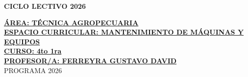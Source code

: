 \documentclass[a4paper,landscape]{article}
\begin{document}

\begin{center}
\fontsize{12pt}{14pt}\selectfont\bfseries CICLO LECTIVO 2026
\end{center}

\vspace{0.5cm}
\noindent\textbf{\underline{ÁREA: TÉCNICA AGROPECUARIA}}\\
\noindent\textbf{\underline{ESPACIO CURRICULAR: MANTENIMIENTO DE MÁQUINAS Y EQUIPOS}}\\
\noindent\textbf{\underline{CURSO: 4to 1ra}}\\
\noindent\textbf{\underline{PROFESOR/A: FERREYRA GUSTAVO DAVID}}\\
\noindent PROGRAMA 2026

\vspace{0.5cm}
\end{document}
